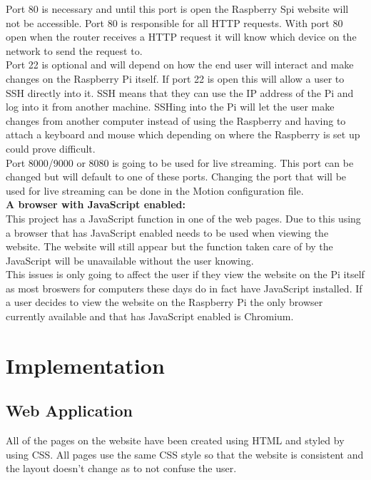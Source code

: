 \documentclass[]{report}
\begin{document}
Port 80 is necessary and until this port is open the Raspberry Spi website will not be accessible. Port 80 is responsible for all HTTP requests. With port 80 open when the router receives a HTTP request it will know which device on the network to send the request to.\\

Port 22 is optional and will depend on how the end user will interact and make changes on the Raspberry Pi itself. If port 22 is open this will allow a user to SSH directly into it. SSH means that they can use the IP address of the Pi and log into it from another machine. SSHing into the Pi will let the user make changes from another computer instead of using the Raspberry and having to attach a keyboard and mouse which depending on where the Raspberry is set up could prove difficult.\\

Port 8000/9000 or 8080 is going to be used for live streaming. This port can be changed but will default to one of these ports. Changing the port that will be used for live streaming can be done in the Motion configuration file.\\

\noindent
{\bf A browser with JavaScript enabled:}\\
\break
This project has a JavaScript function in one of the web pages. Due to this using a browser that has JavaScript enabled needs to be used when viewing the website. The website will still appear but the function taken care of by the JavaScript will be unavailable without the user knowing.\\

This issues is only going to affect the user if they view the website on the Pi itself as most broswers for computers these days do in fact have JavaScript installed. If a user decides to view the website on the Raspberry Pi the only browser currently available and that has JavaScript enabled is Chromium.\\
%
%
\chapter{Implementation}
\label{ch:implem}
\section{Web Application}
\label{sec:webapp}
All of the pages on the website have been created using HTML and styled by using CSS. All pages use the same CSS style so that the website is consistent and the layout doesn't change as to not confuse the user.\\
\end{document}
